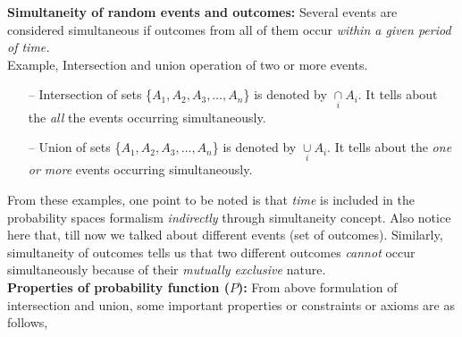 \documentclass[12pt]{report} %
\begin{document}
	\noindent
	\textbf{Simultaneity of random events and outcomes:} Several events are considered simultaneous if outcomes from all of them occur \textit{within a given period of time.} \\
	Example, Intersection and union operation of two or more events.\\ 
		\begin{itemize}
			\item[--] Intersection of sets \{$A_1,A_2,A_3,\dots,A_n$\} is denoted by $\underset{i}{\cap}A_i$. It tells about the \textit{all} the events occurring simultaneously.
			\item[--] Union of sets \{$A_1,A_2,A_3,\dots,A_n$\} is denoted by $\underset{i}{\cup}A_i$. It tells about the \textit{one or more} events occurring simultaneously.
		\end{itemize}
	From these examples, one point to be noted is that \textit{time} is included in the probability spaces formalism \textit{indirectly} through simultaneity concept. Also notice here that, till now we talked about different events (set of outcomes). Similarly, simultaneity of outcomes tells us that two different outcomes \textit{cannot} occur simultaneously because of their \textit{mutually exclusive} nature. \\
	
	\noindent
	\textbf{Properties of probability function ($P$):}
	From above formulation of intersection and union, some important properties or constraints or axioms are as follows,
		
\end{document}
